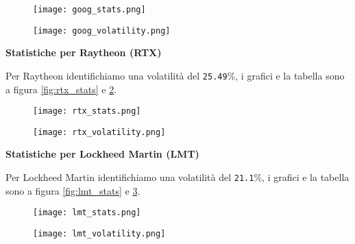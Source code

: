 \begin{figure}[h]
  \centering
  \begin{minipage}{.5\textwidth}
    \centering
    \vspace{4.85cm}
    \texttt{[image: goog\_stats.png]}
    \label{fig:goog_stats}
  \end{minipage}%
  \begin{minipage}{.5\textwidth}
    \centering
    \texttt{[image: goog\_volatility.png]}
    \label{fig:goog_vol}
  \end{minipage}
\end{figure}

\pagebreak

\textbf{Statistiche per Raytheon (RTX)}

Per Raytheon identifichiamo una volatilità del \verb|25.49|\%, i grafici e la tabella sono a figura \ref{fig:rtx_stats} e \ref{fig:rtx_vol}.

\begin{figure}[h]
  \centering
  \begin{minipage}{.5\textwidth}
    \centering
    \vspace{4.85cm}
    \texttt{[image: rtx\_stats.png]}
    \label{fig:rtx_stats}
  \end{minipage}%
  \begin{minipage}{.5\textwidth}
    \centering
    \texttt{[image: rtx\_volatility.png]}
    \label{fig:rtx_vol}
  \end{minipage}
\end{figure}

\textbf{Statistiche per Lockheed Martin (LMT)}

Per Lockheed Martin identifichiamo una volatilità del \verb|21.1|\%, i grafici e la tabella sono a figura \ref{fig:lmt_stats} e \ref{fig:lmt_vol}.

\begin{figure}[h]
  \centering
  \begin{minipage}{.5\textwidth}
    \centering
    \vspace{4.35cm}
    \texttt{[image: lmt\_stats.png]}
    \label{fig:lmt_stats}
  \end{minipage}%
  \begin{minipage}{.5\textwidth}
    \centering
    \texttt{[image: lmt\_volatility.png]}
    \label{fig:lmt_vol}
  \end{minipage}
\end{figure}

